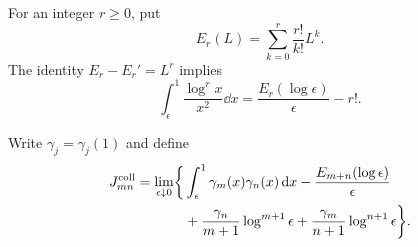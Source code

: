 For an integer $r\ge0$, put
\begin{equation}
 E_r(L)=\sum_{k=0}^r\frac{r!}{k!}L^k.
 \label{scoll:eq:E-polynomial}
\end{equation}
The identity $E_r-E_r'=L^r$ implies
\begin{equation}
 \int_\epsilon^1\frac{\log^r x}{x^2}\dd x
 =\frac{E_r(\log\epsilon)}{\epsilon}-r!.
 \label{scoll:eq:double-endpoint}
\end{equation}

\begin{definition}
\label{scoll:def:J}
Write $\gamma_j=\gamma_j(1)$ and define
\begin{align}
 J_{mn}^{\mathrm{coll}}=\lim_{\epsilon\downarrow0}\biggl\{
 &\int_\epsilon^1\gamma_m(x)\gamma_n(x)\,\mathrm d x
       -\frac{E_{m+n}(\log\epsilon)}\epsilon\notag\\
 &+\frac{\gamma_n}{m+1}\log^{m+1}\epsilon
       +\frac{\gamma_m}{n+1}\log^{n+1}\epsilon\biggr\}.
 \label{scoll:eq:J-cutoff}
\end{align}
\end{definition}

